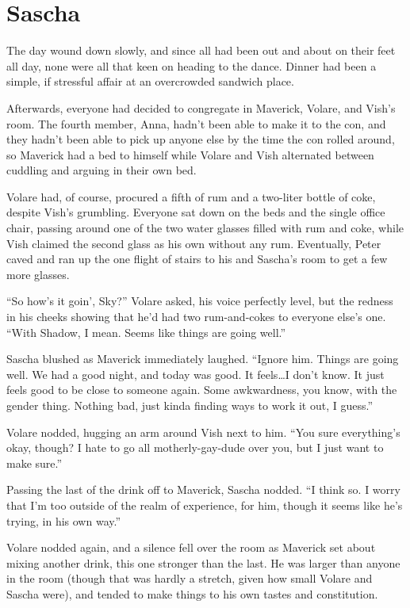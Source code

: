 \chapter{Sascha}

The day wound down slowly, and since all had been out and about on their feet all day, none were all that keen on heading to the dance. Dinner had been a simple, if stressful affair at an overcrowded sandwich place.

Afterwards, everyone had decided to congregate in Maverick, Volare, and Vish's room. The fourth member, Anna, hadn't been able to make it to the con, and they hadn't been able to pick up anyone else by the time the con rolled around, so Maverick had a bed to himself while Volare and Vish alternated between cuddling and arguing in their own bed.

Volare had, of course, procured a fifth of rum and a two-liter bottle of coke, despite Vish's grumbling. Everyone sat down on the beds and the single office chair, passing around one of the two water glasses filled with rum and coke, while Vish claimed the second glass as his own without any rum. Eventually, Peter caved and ran up the one flight of stairs to his and Sascha's room to get a few more glasses.

``So how's it goin', Sky?'' Volare asked, his voice perfectly level, but the redness in his cheeks showing that he'd had two rum-and-cokes to everyone else's one. ``With Shadow, I mean. Seems like things are going well.''

Sascha blushed as Maverick immediately laughed. ``Ignore him. Things are going well. We had a good night, and today was good. It feels\ldots{}I don't know. It just feels good to be close to someone again. Some awkwardness, you know, with the gender thing. Nothing bad, just kinda finding ways to work it out, I guess.''

Volare nodded, hugging an arm around Vish next to him. ``You sure everything's okay, though? I hate to go all motherly-gay-dude over you, but I just want to make sure.''

Passing the last of the drink off to Maverick, Sascha nodded. ``I think so. I worry that I'm too outside of the realm of experience, for him, though it seems like he's trying, in his own way.''

Volare nodded again, and a silence fell over the room as Maverick set about mixing another drink, this one stronger than the last. He was larger than anyone in the room (though that was hardly a stretch, given how small Volare and Sascha were), and tended to make things to his own tastes and constitution.

